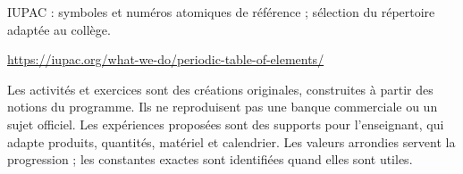 \par\noindent\begin{minipage}{\linewidth}
IUPAC : symboles et numéros atomiques de référence ; sélection du répertoire adaptée au collège.\par{\fontsize{8.5}{11}\selectfont\raggedright\url{https://iupac.org/what-we-do/periodic-table-of-elements/}\par}\end{minipage}\par
{}
Les activités et exercices sont des créations originales, construites à partir des notions du programme. Ils ne reproduisent pas une banque commerciale ou un sujet officiel. Les expériences proposées sont des supports pour l’enseignant, qui adapte produits, quantités, matériel et calendrier. Les valeurs arrondies servent la progression ; les constantes exactes sont identifiées quand elles sont utiles.
